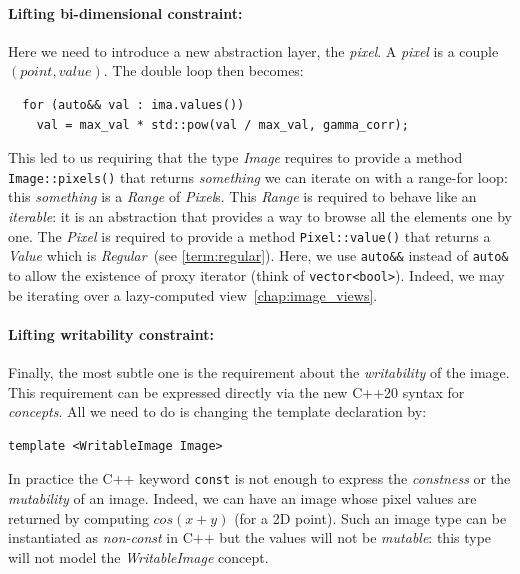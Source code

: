 \paragraph{Lifting bi-dimensional constraint:}
Here we need to introduce a new abstraction layer, the \emph{pixel}. A \emph{pixel} is a couple \((point, value)\). The
double loop then becomes:

\begin{verbatim}
  for (auto&& val : ima.values())
    val = max_val * std::pow(val / max_val, gamma_corr);
\end{verbatim}

\noindent This led to us requiring that the type \emph{Image} requires to provide a method \texttt{Image::pixels()} that
returns \emph{something} we can iterate on with a range-for loop: this \emph{something} is a \emph{Range} of
\emph{Pixel}s. This \emph{Range} is required to behave like an \emph{iterable}: it is an abstraction that provides a way
to browse all the elements one by one. The \emph{Pixel} is required to provide a method \texttt{Pixel::value()} that
returns a \emph{Value} which is \emph{Regular}~(see \cref{term:regular}). Here, we use \texttt{auto\&\&} instead of
\texttt{auto\&} to allow the existence of proxy iterator (think of \texttt{vector<bool>}). Indeed, we may be iterating
over a lazy-computed view~\cref{chap:image_views}.



\paragraph{Lifting writability constraint:}
Finally, the most subtle one is the requirement about the \emph{writability} of the image. This requirement can be
expressed directly via the new C++20 syntax for \emph{concepts}. All we need to do is changing the template declaration
by:

\begin{verbatim}
template <WritableImage Image>
\end{verbatim}

\noindent In practice the C++ keyword \texttt{const} is not enough to express the \emph{constness} or the
\emph{mutability} of an image. Indeed, we can have an image whose pixel values are returned by computing \(cos(x+y)\)
(for a 2D point). Such an image type can be instantiated as \emph{non-const} in C++ but the values will not be
\emph{mutable}: this type will not model the \emph{WritableImage} concept.




